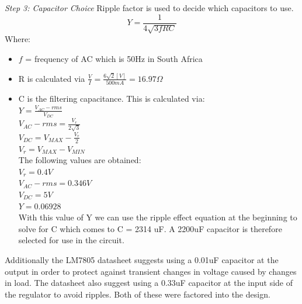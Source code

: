\textit{Step 3: Capacitor Choice}
Ripple factor is used to decide which capacitors to use.
$$Y=\frac{1}{4 \sqrt{3fRC}}$$
Where:
\begin{itemize}
\item $f$ = frequency of AC which is 50Hz in South Africa
\item R is calculated via $\frac{V}{I}=\frac{6\sqrt{2}[V]}{500mA}=16.97\Omega$
\item C is the filtering capacitance. This is calculated via:\\
$Y=\frac{V_{AC}-rms}{V_{DC}}$\\
$V_{AC}-rms=\frac{V_r}{2\sqrt{3}}$\\
$V_{DC}=V_{MAX}-\frac{V_r}{2}$\\
$V_r=V_{MAX}-V_{MIN}$\\
The following values are obtained:\\
$V_r=0.4V$\\
$V_{AC}-rms=0.346V$\\
$V_{DC}=5V$\\
$Y=0.06928$\\
With this value of Y we can use the ripple effect equation at the beginning to solve for C
which comes to C = 2314 uF. A 2200uF capacitor is therefore selected for use in the circuit.
\end{itemize}

Additionally the LM7805 datasheet suggests using a 0.01uF capacitor at the output in order to
protect against transient changes in voltage caused by changes in load. The datasheet also suggest
using a 0.33uF capacitor at the input side of the regulator to avoid ripples. Both of these were
factored into the design.

